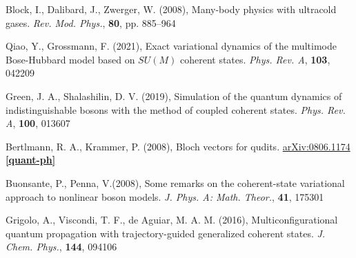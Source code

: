\documentclass[12pt]{report}
\begin{document}
\begin{thebibliography}{10}
	Block, I., Dalibard, J., Zwerger, W. (2008), Many-body physics with ultracold gases. \textit{Rev. Mod. Phys.}, \textbf{80}, pp. 885--964
	
	Qiao, Y., Grossmann, F. (2021), Exact variational dynamics of the multimode Bose-Hubbard model based on $SU(M)$ coherent states. \textit{Phys. Rev. A}, \textbf{103}, 042209
	
	Green, J. A., Shalashilin, D. V. (2019), Simulation of the quantum dynamics of indistinguishable bosons with the method of coupled coherent states. \textit{Phys. Rev. A}, \textbf{100}, 013607
	
	Bertlmann, R. A., Krammer, P. (2008), Bloch vectors for qudits. \href{ 	
https://doi.org/10.48550/arXiv.0806.1174}{arXiv:0806.1174 \textbf{[quant-ph]}}

	Buonsante, P., Penna, V.(2008), Some remarks on the coherent-state variational approach to nonlinear boson models. \textit{J. Phys. A: Math. Theor.}, \textbf{41}, 175301
	
	Grigolo, A., Viscondi, T. F., de Aguiar, M. A. M. (2016), Multiconfigurational quantum propagation with trajectory-guided generalized coherent states. \textit{J. Chem. Phys.}, \textbf{144}, 094106

	\end{thebibliography}
	
	
	\appendix
	
	
	
	
	
	
	

	
	
\end{document}
